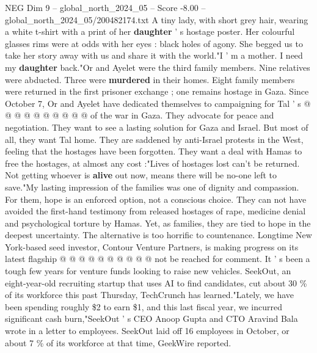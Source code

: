 \begin{textsample}{NEG Dim 9 – global\_north\_2024\_05 – Score -8.00 – global\_north\_2024\_05/200482174.txt}
A tiny lady, with short grey hair, wearing a white t-shirt with a print of her \textbf{daughter} ' s hostage poster.
Her colourful glasses rims were at odds with her eyes : black holes of agony.
She begged us to take her story away with us and share it with the world."I ' m a mother.
I need my \textbf{daughter} back."Or and Ayelet were the third family members.
Nine relatives were abducted.
Three were \textbf{murdered} in their homes.
Eight family members were returned in the first prisoner exchange ; one remains hostage in Gaza.
Since October 7, Or and Ayelet have dedicated themselves to campaigning for Tal ' s @ @ @ @ @ @ @ @ @ @ of the war in Gaza.
They advocate for peace and negotiation.
They want to see a lasting solution for Gaza and Israel.
But most of all, they want Tal home.
They are saddened by anti-Israel protests in the West, feeling that the hostages have been forgotten.
They want a deal with Hamas to free the hostages, at almost any cost :"Lives of hostages lost can't be returned.
Not getting whoever is \textbf{alive} out now, means there will be no-one left to save."My lasting impression of the families was one of dignity and compassion.
For them, hope is an enforced option, not a conscious choice.
They can not have avoided the first-hand testimony from released hostages of rape, medicine denial and psychological torture by Hamas.
Yet, as families, they are tied to hope in the deepest uncertainty.
The alternative is too horrific to countenance.
Longtime New York-based seed investor, Contour Venture Partners, is making progress on its latest flagship @ @ @ @ @ @ @ @ @ @ not be reached for comment.
It ' s been a tough few years for venture funds looking to raise new vehicles.
SeekOut, an eight-year-old recruiting startup that uses AI to find candidates, cut about 30 \% of its workforce this past Thursday, TechCrunch has learned."Lately, we have been spending roughly \$2 to earn \$1, and this last fiscal year, we incurred significant cash burn,"SeekOut ' s CEO Anoop Gupta and CTO Aravind Bala wrote in a letter to employees.
SeekOut laid off 16 employees in October, or about 7 \% of its workforce at that time, GeekWire reported.

\end{textsample}
